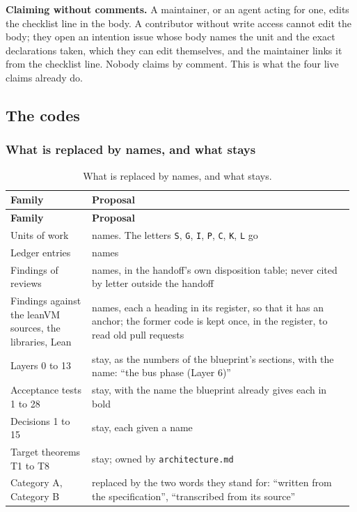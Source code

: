 \textbf{Claiming without comments.} A maintainer, or an agent acting for one, edits the checklist line in the body. A contributor without write access cannot edit the body; they open an intention issue whose body names the unit and the exact declarations taken, which they can edit themselves, and the maintainer links it from the checklist line. Nobody claims by comment. This is what the four live claims already do.

\subsection{The codes}\label{sec:docs-proposal-codes}

\subsubsection{What is replaced by names, and what stays}\label{sec:docs-codes-fate}

{\footnotesize\setlength{\tabcolsep}{3pt}
\begin{longtable}{@{}>{\raggedright\arraybackslash}p{0.236\linewidth}>{\raggedright\arraybackslash}p{0.747\linewidth}@{}}
\caption{What is replaced by names, and what stays.}\label{tab:docs-codes-fate}\\
\toprule
\textbf{Family} & \textbf{Proposal} \\
\midrule
\endfirsthead
\toprule
\textbf{Family} & \textbf{Proposal} \\
\midrule
\endhead
\bottomrule
\endfoot
Units of work & names. The letters \texttt{S}, \texttt{G}, \texttt{I}, \texttt{P}, \texttt{C}, \texttt{K}, \texttt{L} go \\\addlinespace[2pt]
Ledger entries & names \\\addlinespace[2pt]
Findings of reviews & names, in the handoff's own disposition table; never cited by letter outside the handoff \\\addlinespace[2pt]
Findings against the leanVM sources, the libraries, Lean & names, each a heading in its register, so that it has an anchor; the former code is kept once, in the register, to read old pull requests \\\addlinespace[2pt]
Layers 0 to 13 & stay, as the numbers of the blueprint's sections, with the name: ``the bus phase (Layer 6)'' \\\addlinespace[2pt]
Acceptance tests 1 to 28 & stay, with the name the blueprint already gives each in bold \\\addlinespace[2pt]
Decisions 1 to 15 & stay, each given a name \\\addlinespace[2pt]
Target theorems T1 to T8 & stay; owned by \texttt{architecture.\allowbreak{}md} \\\addlinespace[2pt]
Category A, Category B & replaced by the two words they stand for: ``written from the specification'', ``transcribed from its source'' \\
\end{longtable}}


